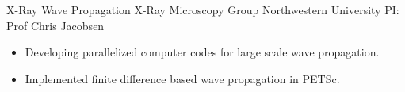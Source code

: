 

        {X-Ray Wave Propagation}
        {\newline X-Ray Microscopy Group}
        {Northwestern University}
        {PI: Prof Chris Jacobsen}{
    \begin{itemize}
		\item Developing parallelized computer codes for large scale wave propagation.
		\item Implemented finite difference based wave propagation in PETSc.
    \end{itemize}
	}

